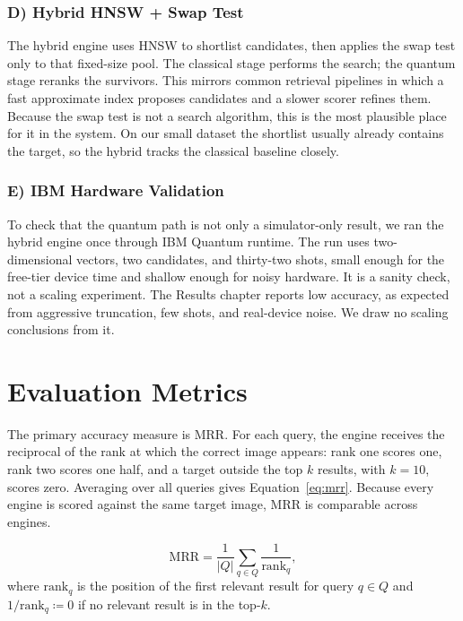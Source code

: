\subsubsection{D) Hybrid HNSW + Swap Test}
The hybrid engine uses HNSW to shortlist candidates, then applies the swap test
only to that fixed-size pool. The classical stage performs the search; the
quantum stage reranks the survivors. This mirrors common retrieval pipelines in
which a fast approximate index proposes candidates and a slower scorer refines
them. Because the swap test is not a search algorithm, this is the most plausible
place for it in the system. On our small dataset the shortlist usually already
contains the target, so the hybrid tracks the classical baseline closely.

\subsubsection{E) IBM Hardware Validation}
To check that the quantum path is not only a simulator-only result, we ran the
hybrid engine once through IBM Quantum runtime. The run uses two-dimensional
vectors, two candidates, and thirty-two shots, small enough for the free-tier
device time and shallow enough for noisy hardware. It is a sanity check, not a
scaling experiment. The Results chapter reports low accuracy, as expected from
aggressive truncation, few shots, and real-device noise. We draw no scaling
conclusions from it.

\section{Evaluation Metrics}
\label{sec:method:metrics}


The primary accuracy measure is MRR. For each query, the
engine receives the reciprocal of the rank at which the correct image appears:
rank one scores one, rank two scores one half, and a target outside the top $k$
results, with $k=10$, scores zero. Averaging over all queries gives
Equation~\ref{eq:mrr}. Because every engine is scored against the same target
image, MRR is comparable across engines.

\begin{equation}
\text{MRR} = \frac{1}{|Q|} \sum_{q \in Q} \frac{1}{\text{rank}_q},
\label{eq:mrr}
\end{equation}
where $\text{rank}_q$ is the position of the first relevant result for query
$q \in Q$ and $1/\text{rank}_q \coloneqq 0$ if no relevant result is in the top-$k$.

